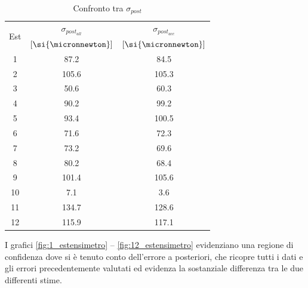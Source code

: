 \documentclass[a4paper,11pt,oneside]{article}
\begin{document}
\begin{table}
\centering
\caption{Confronto tra $\sigma_{post}$}
\label{tab:confronto_sigma_posteriori}
    \begin{tabular}{|c|c|c|}
    \hline
    \multirow{2}{*}{Est} & $\sigma_{post_{all}}$ & $\sigma_{post_{acc}}$ \\
        & $[\si{\micronnewton}]$ & $[\si{\micronnewton}]$  \\\hline
    {\cellcolor[rgb]{0.85,0.85,0.85}}1   & {\cellcolor[rgb]{0.85,0.85,0.85}}87.2       & {\cellcolor[rgb]{0.85,0.85,0.85}}84.5        \\\hline
    2   & 105.6       & 105.3        \\\hline
    {\cellcolor[rgb]{0.85,0.85,0.85}}3   & {\cellcolor[rgb]{0.85,0.85,0.85}}50.6       & {\cellcolor[rgb]{0.85,0.85,0.85}}60.3        \\\hline
    4   & 90.2       & 99.2        \\\hline
    {\cellcolor[rgb]{0.85,0.85,0.85}}5   & {\cellcolor[rgb]{0.85,0.85,0.85}}93.4       & {\cellcolor[rgb]{0.85,0.85,0.85}}100.5        \\\hline
    6   & 71.6       & 72.3        \\\hline
    {\cellcolor[rgb]{0.85,0.85,0.85}}7   & {\cellcolor[rgb]{0.85,0.85,0.85}}73.2       & {\cellcolor[rgb]{0.85,0.85,0.85}}69.6         \\\hline
    8   & 80.2       & 68.4        \\\hline
    {\cellcolor[rgb]{0.85,0.85,0.85}}9   & {\cellcolor[rgb]{0.85,0.85,0.85}}101.4       & {\cellcolor[rgb]{0.85,0.85,0.85}}105.6        \\\hline
    10  & 7.1       & 3.6        \\\hline\hline
    {\cellcolor[rgb]{0.85,0.85,0.85}}11   & {\cellcolor[rgb]{0.85,0.85,0.85}}134.7      & {\cellcolor[rgb]{0.85,0.85,0.85}}128.6       \\\hline
    12  & 115.9      & 117.1       \\\hline

    \end{tabular}
\end{table}

I grafici \ref{fig:1_estensimetro} -- \ref{fig:12_estensimetro} evidenziano una regione di confidenza dove si è tenuto conto dell'errore a posteriori, che ricopre tutti i dati e gli errori precedentemente valutati ed evidenza la sostanziale differenza tra le due differenti stime.
\end{document}
